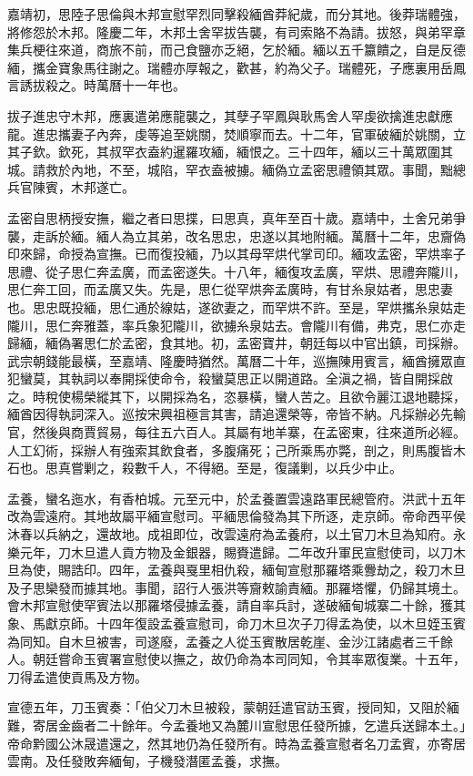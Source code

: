 \begin{pinyinscope}
嘉靖初，思陸子思倫與木邦宣慰罕烈同擊殺緬酋莽紀歲，而分其地。後莽瑞體強，將修怨於木邦。隆慶二年，木邦土舍罕拔告襲，有司索賂不為請。拔怒，與弟罕章集兵梗往來道，商旅不前，而己食鹽亦乏絕，乞於緬。緬以五千籝饋之，自是反德緬，攜金寶象馬往謝之。瑞體亦厚報之，歡甚，約為父子。瑞體死，子應裏用岳鳳言誘拔殺之。時萬曆十一年也。

拔子進忠守木邦，應裏遣弟應龍襲之，其孽子罕鳳與耿馬舍人罕虔欲擒進忠獻應龍。進忠攜妻子內奔，虔等追至姚關，焚順寧而去。十二年，官軍破緬於姚關，立其子欽。欽死，其叔罕衣盍約暹羅攻緬，緬恨之。三十四年，緬以三十萬眾圍其城。請救於內地，不至，城陷，罕衣盍被擄。緬偽立孟密思禮領其眾。事聞，黜總兵官陳賓，木邦遂亡。

孟密自思柄授安撫，繼之者曰思揲，曰思真，真年至百十歲。嘉靖中，土舍兄弟爭襲，走訴於緬。緬人為立其弟，改名思忠，忠遂以其地附緬。萬曆十二年，忠齎偽印來歸，命授為宣撫。已而復投緬，乃以其母罕烘代掌司印。緬攻孟密，罕烘率子思禮、從子思仁奔孟廣，而孟密遂失。十八年，緬復攻孟廣，罕烘、思禮奔隴川，思仁奔工回，而孟廣又失。先是，思仁從罕烘奔孟廣時，有甘糸泉姑者，思忠妻也。思忠既投緬，思仁通於線姑，遂欲妻之，而罕烘不許。至是，罕烘攜糸泉姑走隴川，思仁奔雅蓋，率兵象犯隴川，欲擄糸泉姑去。會隴川有備，弗克，思仁亦走歸緬，緬偽署思仁於孟密，食其地。初，孟密寶井，朝廷每以中官出鎮，司採辦。武宗朝錢能最橫，至嘉靖、隆慶時猶然。萬曆二十年，巡撫陳用賓言，緬酋擁眾直犯蠻莫，其執詞以奉開採使命令，殺蠻莫思正以開道路。全滇之禍，皆自開採啟之。時稅使楊榮縱其下，以開採為名，恣暴橫，蠻人苦之。且欲令麗江退地聽採，緬酋因得執詞深入。巡按宋興祖極言其害，請追還榮等，帝皆不納。凡採辦必先輸官，然後與商賈貿易，每往五六百人。其屬有地羊寨，在孟密東，往來道所必經。人工幻術，採辦人有強索其飲食者，多腹痛死；己所乘馬亦斃，剖之，則馬腹皆木石也。思真嘗剿之，殺數千人，不得絕。至是，復議剿，以兵少中止。

孟養，蠻名迤水，有香柏城。元至元中，於孟養置雲遠路軍民總管府。洪武十五年改為雲遠府。其地故屬平緬宣慰司。平緬思倫發為其下所逐，走京師。帝命西平侯沐春以兵納之，還故地。成祖即位，改雲遠府為孟養府，以土官刀木旦為知府。永樂元年，刀木旦遣人貢方物及金銀器，賜賚遣歸。二年改升軍民宣慰使司，以刀木旦為使，賜誥印。四年，孟養與戛里相仇殺，緬甸宣慰那羅塔乘釁劫之，殺刀木旦及子思欒發而據其地。事聞，詔行人張洪等齎敕諭責緬。那羅塔懼，仍歸其境土。會木邦宣慰使罕賓法以那羅塔侵據孟養，請自率兵討，遂破緬甸城寨二十餘，獲其象、馬獻京師。十四年復設孟養宣慰司，命刀木旦次子刀得孟為使，以木旦姪玉賓為同知。自木旦被害，司遂廢，孟養之人從玉賓散居乾崖、金沙江諸處者三千餘人。朝廷嘗命玉賓署宣慰使以撫之，故仍命為本司同知，令其率眾復業。十五年，刀得孟遣使貢馬及方物。

宣德五年，刀玉賓奏：「伯父刀木旦被殺，蒙朝廷遣官訪玉賓，授同知，又阻於緬難，寄居金齒者二十餘年。今孟養地又為麓川宣慰思任發所據，乞遣兵送歸本土。」帝命黔國公沐晟遣還之，然其地仍為任發所有。時為孟養宣慰者名刀孟賓，亦寄居雲南。及任發敗奔緬甸，子機發潛匿孟養，求撫。


\end{pinyinscope}
